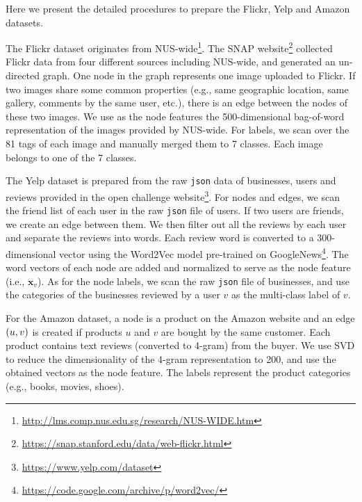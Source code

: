 Here we present the detailed procedures to prepare the Flickr, Yelp and Amazon datasets.

The Flickr dataset originates from NUS-wide\footnote{\url{http://lms.comp.nus.edu.sg/research/NUS-WIDE.htm}}. The SNAP website\footnote{\url{https://snap.stanford.edu/data/web-flickr.html}} collected Flickr data from four different sources including NUS-wide, and generated an un-directed graph. 
One node in the graph represents one image uploaded to Flickr. If two images share some common properties (e.g., same geographic location, same gallery, comments by the same user, etc.), there is an edge between the nodes of these two images. %
We use as the node features the 500-dimensional bag-of-word representation of the images provided by NUS-wide. For labels, we scan over the 81 tags of each image and manually merged them to 7 classes. Each image belongs to one of the 7 classes. %


The Yelp dataset is prepared from the raw \texttt{json} data of businesses, users and reviews provided in the open challenge website\footnote{\url{https://www.yelp.com/dataset}}. For nodes and edges, we scan the friend list of each user in the raw \texttt{json} file of users. If two users are friends, we create an edge between them. We then filter out all the reviews by each user and separate the reviews into words. Each review word is converted to a 300-dimensional vector using the Word2Vec model pre-trained on GoogleNews\footnote{\url{https://code.google.com/archive/p/word2vec/}}. The word vectors of each node are added and normalized to serve as the node feature (i.e., $\bm{x}_v$). As for the node labels, we scan the raw \texttt{json} file of businesses, and use the categories of the businesses reviewed by a user $v$ as the multi-class label of $v$. %


For the Amazon dataset, a node is a product on the Amazon website and an edge $\left( u,v \right)$ is created if products $u$ and $v$ are bought by the same customer. 
Each product contains text reviews (converted to 4-gram) from the buyer. We use SVD to reduce the dimensionality of the 4-gram representation to 200, and use the obtained vectors as the node feature. The labels represent the product categories (e.g., books, movies, shoes).  



